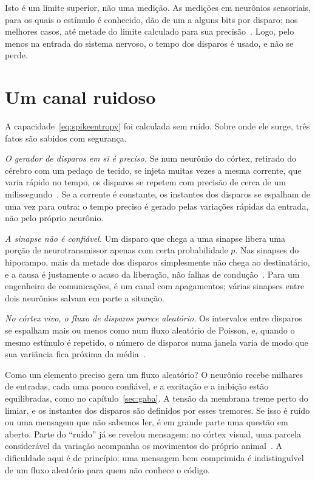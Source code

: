 Isto é um limite superior, não uma medição. As medições em neurônios sensoriais, para os quais o estímulo é conhecido, dão de um a alguns bits por disparo; nos melhores casos, até metade do limite calculado para sua precisão~\cite{Rieke1997}. Logo, pelo menos na entrada do sistema nervoso, o tempo dos disparos é usado, e não se perde.

\section{Um canal ruidoso}

A capacidade~\eqref{eq:spikeentropy} foi calculada sem ruído. Sobre onde ele surge, três fatos são sabidos com segurança.

\emph{O gerador de disparos em si é preciso.} Se num neurônio do córtex, retirado do cérebro com um pedaço de tecido, se injeta muitas vezes a mesma corrente, que varia rápido no tempo, os disparos se repetem com precisão de cerca de um milissegundo~\cite{Mainen1995}. Se a corrente é constante, os instantes dos disparos se espalham de uma vez para outra: o tempo preciso é gerado pelas variações rápidas da entrada, não pelo próprio neurônio.

\emph{A sinapse não é confiável.} Um disparo que chega a uma sinapse  libera uma porção de neurotransmissor apenas com certa probabilidade $p$. Nas sinapses do hipocampo, mais da metade dos disparos simplesmente não chega ao destinatário, e a causa é justamente o acaso da liberação, não falhas de condução~\cite{AllenStevens1994}. Para um engenheiro de comunicações, é um canal com apagamentos; várias sinapses entre dois neurônios salvam em parte a situação.

\emph{No córtex vivo, o fluxo de disparos parece aleatório.} Os intervalos entre disparos se espalham mais ou menos como num fluxo aleatório de Poisson, e, quando o mesmo estímulo é repetido, o número de disparos numa janela varia de modo que sua variância fica próxima da média~\cite{Softky1993}.

Como um elemento preciso gera um fluxo aleatório? O neurônio recebe milhares de entradas, cada uma pouco confiável, e a excitação e a inibição estão equilibradas, como no capítulo~\ref{sec:gaba}. A tensão da membrana treme perto do limiar, e os instantes dos disparos são definidos por esses tremores. Se isso é ruído ou uma mensagem que não sabemos ler, é em grande parte uma questão em aberto. Parte do ``ruído'' já se revelou mensagem: no córtex visual, uma parcela considerável da variação acompanha os movimentos do próprio animal~\cite{Stringer2019}. A dificuldade aqui é de princípio: uma mensagem bem comprimida é indistinguível de um fluxo aleatório para quem não conhece o código.

